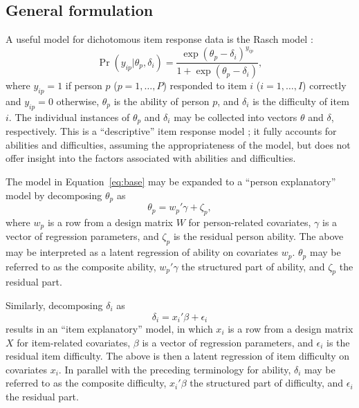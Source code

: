 \documentclass[12pt, letterpaper]{article}
\begin{document}
\subsection{General formulation}

A useful model for dichotomous item response data is the Rasch model \parencite{Rasch1960a}:
\begin{equation} \label{eq:base}
	\Pr ( y_{ip} | \theta_p, \delta_i) =
	\frac {\exp(\theta_p - \delta_i)^{y_{ip}}}
	{1 + \exp(\theta_p - \delta_i)}
,\end{equation}
where $y_{ip} = 1$ if person $p$ ($p = 1, \dotsc, P$) responded to item $i$ ($i = 1, \dotsc, I$) correctly and $y_{ip} = 0$ otherwise, $\theta_p$ is the ability of person $p$, and $\delta_i$ is the difficulty of item $i$. The individual instances of $\theta_p$ and $\delta_i$ may be collected into vectors $\theta$ and $\delta$, respectively. This is a ``descriptive'' item response model \parencite{Wilson2004}; it fully accounts for abilities and difficulties, assuming the appropriateness of the model, but does not offer insight into the factors associated with abilities and difficulties.

The model in Equation~\ref{eq:base} may be expanded to a ``person explanatory'' model by decomposing $\theta_p$ as
\begin{equation} \label{eq:theta}
	\theta_p = w_p' \gamma + \zeta_p
,\end{equation}
where $w_p$ is a row from a design matrix $W$ for person-related covariates, $\gamma$ is a vector of regression parameters, and $\zeta_p$ is the residual person ability. The above may be interpreted as a latent regression of ability on covariates $w_p$. $\theta_p$ may be referred to as the composite ability, $w_p' \gamma$ the structured part of ability, and $\zeta_p$ the residual part.

Similarly, decomposing $\delta_i$ as
\begin{equation} \label{eq:delta}
	\delta_i = x_i' \beta + \epsilon_i
\end{equation}
results in an ``item explanatory'' model, in which $x_i$ is a row from a design matrix $X$ for item-related covariates, $\beta$ is a vector of regression parameters, and $\epsilon_i$ is the residual item difficulty. The above is then a latent regression of item difficulty on covariates $x_i$. In parallel with the preceding terminology for ability, $\delta_i$ may be referred to as the composite difficulty, $x_i' \beta$ the structured part of difficulty, and $\epsilon_i$ the residual part.
\end{document}
